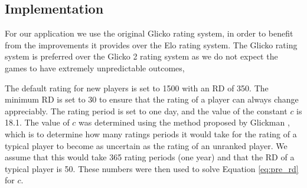 \subsection{Implementation}
For our application we use the original Glicko rating system, in order to benefit from the improvements it provides over the Elo rating system.
The Glicko rating system is preferred over the Glicko 2 rating system as we do not expect the games to have extremely unpredictable outcomes, 

The default rating for new players is set to 1500 with an RD of 350.
The minimum RD is set to 30 to ensure that the rating of a player can always change appreciably.
The rating period is set to one day, and the value of the constant $c$ is 18.1.
The value of $c$ was determined using the method proposed by Glickman \cite{glicko}, which is to determine how many ratings periods it would take for the rating of a typical player to become as uncertain as the rating of an unranked player.
We assume that this would take 365 rating periods (one year) and that the RD of a typical player is 50.
These numbers were then used to solve Equation \ref{eq:pre_rd} for $c$.
